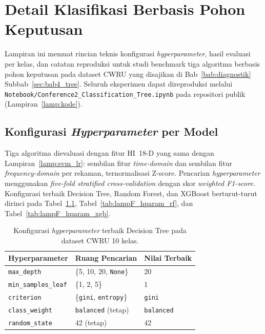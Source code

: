 
\chapter{Detail Klasifikasi Berbasis Pohon Keputusan}
\label{lamp:tree}

Lampiran ini memuat rincian teknis konfigurasi \emph{hyperparameter},
hasil evaluasi per kelas, dan catatan reproduksi untuk studi
benchmark tiga algoritma berbasis pohon keputusan pada dataset CWRU
yang disajikan di Bab~\ref{bab:diagnostik} Subbab~\ref{sec:bab4_tree}.
Seluruh eksperimen dapat direproduksi melalui
\texttt{Notebook/Conference2\_Classification\_Tree.ipynb}
pada repositori publik (Lampiran~\ref{lamp:kode}).

\section{Konfigurasi \emph{Hyperparameter} per Model}
\label{lamp:tree_hparam}

Tiga algoritma dievaluasi dengan fitur HI~18-D yang sama dengan
Lampiran~\ref{lamp:svm_lr}: sembilan fitur \emph{time-domain} dan
sembilan fitur \emph{frequency-domain} per rekaman, ternormalisasi
Z-score. Pencarian \emph{hyperparameter} menggunakan
\emph{five-fold stratified cross-validation} dengan skor
\emph{weighted F1-score}. Konfigurasi terbaik Decision Tree,
Random Forest, dan XGBoost berturut-turut dirinci pada
Tabel~\ref{tab:lampF_hparam_dt}, Tabel~\ref{tab:lampF_hparam_rf},
dan Tabel~\ref{tab:lampF_hparam_xgb}.

\begin{table}[ht]
  \centering
  \caption{Konfigurasi \emph{hyperparameter} terbaik Decision Tree
           pada dataset CWRU 10 kelas.}
  \label{tab:lampF_hparam_dt}
  \footnotesize
  \begin{tabularx}{\textwidth}{@{}l X X@{}}
    \toprule
    \textbf{Hyperparameter} & \textbf{Ruang Pencarian} & \textbf{Nilai Terbaik} \\
    \midrule
    \texttt{max\_depth}           & \{5, 10, 20, \texttt{None}\}   & 20 \\
    \texttt{min\_samples\_leaf}   & \{1, 2, 5\}                    & 1 \\
    \texttt{criterion}            & \{\texttt{gini}, \texttt{entropy}\} & \texttt{gini} \\
    \texttt{class\_weight}        & \texttt{balanced} (tetap)      & \texttt{balanced} \\
    \texttt{random\_state}        & 42 (tetap)                     & 42 \\
    \bottomrule
  \end{tabularx}
\end{table}

